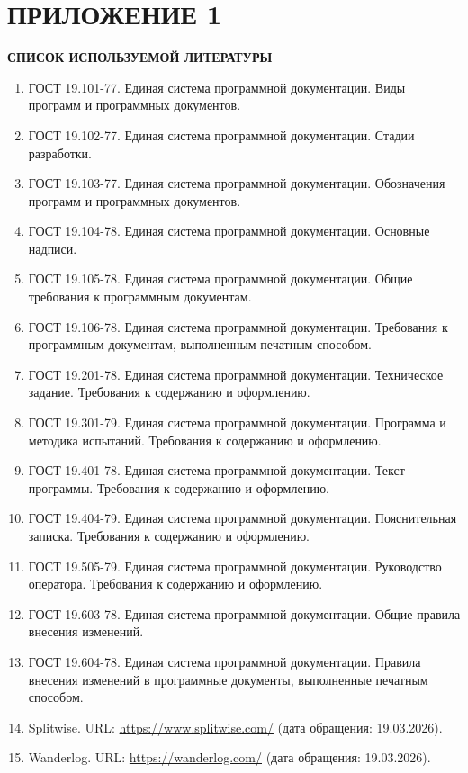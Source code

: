 \documentclass[12pt,a4paper]{article}
\begin{document}
\section*{ПРИЛОЖЕНИЕ 1}
\begin{center}
  \textbf{СПИСОК ИСПОЛЬЗУЕМОЙ ЛИТЕРАТУРЫ}
\end{center}
\begin{enumerate}
  \item ГОСТ 19.101-77. Единая система программной документации. Виды программ и программных документов.
  \item ГОСТ 19.102-77. Единая система программной документации. Стадии разработки.
  \item ГОСТ 19.103-77. Единая система программной документации. Обозначения программ и программных документов.
  \item ГОСТ 19.104-78. Единая система программной документации. Основные надписи.
  \item ГОСТ 19.105-78. Единая система программной документации. Общие требования к программным документам.
  \item ГОСТ 19.106-78. Единая система программной документации. Требования к программным документам, выполненным печатным способом.
  \item ГОСТ 19.201-78. Единая система программной документации. Техническое задание. Требования к содержанию и оформлению.
  \item ГОСТ 19.301-79. Единая система программной документации. Программа и методика испытаний. Требования к содержанию и оформлению.
  \item ГОСТ 19.401-78. Единая система программной документации. Текст программы. Требования к содержанию и оформлению.
  \item ГОСТ 19.404-79. Единая система программной документации. Пояснительная записка. Требования к содержанию и оформлению.
  \item ГОСТ 19.505-79. Единая система программной документации. Руководство оператора. Требования к содержанию и оформлению.
  \item ГОСТ 19.603-78. Единая система программной документации. Общие правила внесения изменений.
  \item ГОСТ 19.604-78. Единая система программной документации. Правила внесения изменений в программные документы, выполненные печатным способом.
  \item Splitwise. URL: \url{https://www.splitwise.com/} (дата обращения: 19.03.2026).
  \item Wanderlog. URL: \url{https://wanderlog.com/} (дата обращения: 19.03.2026).

\end{enumerate}
\end{document}
